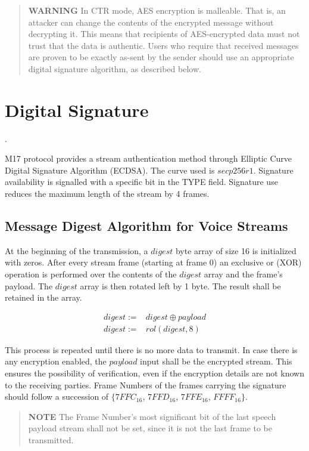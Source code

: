 \documentclass[a4paper,11pt,oneside]{book}
\begin{document}
\begin{quote}
	\textbf{WARNING} In CTR mode, AES encryption is malleable. That is, an attacker can change the contents of the encrypted message without decrypting it. This means that recipients of AES-encrypted data must not trust that the data is authentic. Users who require that received messages are proven to be exactly as-sent by the sender should use an appropriate digital signature algorithm, as described below.
\end{quote}

\chapter{Digital Signature} \label{digital_signature}.

M17 protocol provides a stream authentication method through Elliptic Curve Digital Signature Algorithm (ECDSA). The curve used is $secp256r1$. Signature availability is signalled with a specific bit in the TYPE field. Signature use reduces the maximum length of the stream by 4 frames.

\section{Message Digest Algorithm for Voice Streams}
At the beginning of the transmission, a $digest$ byte array of size 16 is initialized with zeros. After every stream frame (starting at frame 0) an exclusive or (XOR) operation is performed over the contents of the $digest$ array and the frame's payload. The $digest$ array is then rotated left by 1 byte. The result shall be retained in the array.

\begin{align*}
	digest :=& digest \oplus payload \\
	digest :=& rol(digest, 8)
\end{align*}

This process is repeated until there is no more data to transmit. In case there is any encryption enabled,
the $payload$ input shall be the encrypted stream. This ensures the possibility of verification, even if the
encryption details are not known to the receiving parties. Frame Numbers of the frames carrying the
signature should follow a succession of $\{7FFC_{16}$, $7FFD_{16}$, $7FFE_{16}$, $FFFF_{16}\}$.

\begin{quote}
	\textbf{NOTE} The Frame Number's most significant bit of the last speech payload stream shall not be set, since it is not the last frame to be transmitted.
\end{quote}
\end{document}
